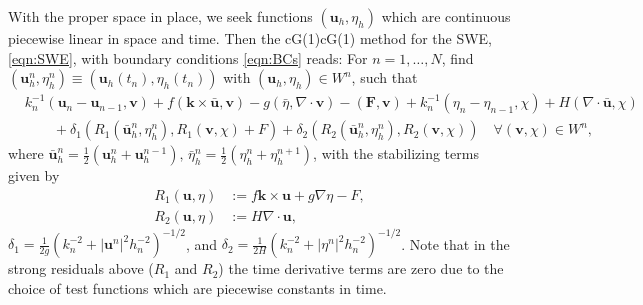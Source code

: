 With the proper space in place, we seek functions $(\mathbf{u}_h, \eta_h)$ which
are continuous piecewise linear in space and time. Then the cG(1)cG(1) method
for the SWE, \eqref{eqn:SWE}, with boundary conditions \eqref{eqn:BCs} reads:
For $n = 1, \dots, N$, find $(\mathbf{u}_h^n, \eta_h^n) \equiv
(\mathbf{u}_h(t_n), \eta_h(t_n))$ with $(\mathbf{u}_h, \eta_h) \in W^n$, such
that
\begin{equation}
  \begin{split}
    &k_n^{-1}(\mathbf{u}_n - \mathbf{u}_{n-1}, \mathbf{v}) + f(\mathbf{k} \times
        \bar{\mathbf{u}}, \mathbf{v}) - g (\bar{\eta}, \nabla\cdot \mathbf{v}) -
        (\mathbf{F},\mathbf{v}) + k_n^{-1}(\eta_n - \eta_{n-1}, \chi) + H
        (\nabla\cdot \bar{\mathbf{u}},\chi) \\
    &\qquad+ \delta_1 ( R_1(\bar{\mathbf{u}}_h^n, \eta_h^n),
        R_1(\mathbf{v}, \chi) + F)
    + \delta_2 (R_2(\bar{\mathbf{u}}_h^n, \eta_h^n),
        R_2(\mathbf{v}, \chi))
    \quad \forall (\mathbf{v},\chi) \in W^n,
  \end{split}
  \label{eqn:cG1cG1}
\end{equation}
where $\bar{\mathbf{u}}_h^n = \frac{1}{2}(\mathbf{u}_h^n + \mathbf{u}_h^{n-1}),\,
\bar{\eta}_h^n = \frac{1}{2}(\eta_h^n + \eta_h^{n+1})$, with the stabilizing
terms given by
\begin{align*}
  R_1(\mathbf{u},\eta) &:= f\mathbf{k} \times \mathbf{u} + g \nabla \eta - F, \\
  R_2(\mathbf{u},\eta) &:= H \nabla\cdot \mathbf{u},
\end{align*}
$\delta_1 = \frac{1}{2g}(k_n^{-2} + |\mathbf{u}^n|^2 h_n^{-2})^{-1/2}$, and
$\delta_2 = \frac{1}{2H}(k_n^{-2} + |\eta^n|^2 h_n^{-2})^{-1/2}$. Note that in
the strong residuals above ($R_1$ and $R_2$) the time derivative terms are zero
due to the choice of test functions which are piecewise constants in time.
